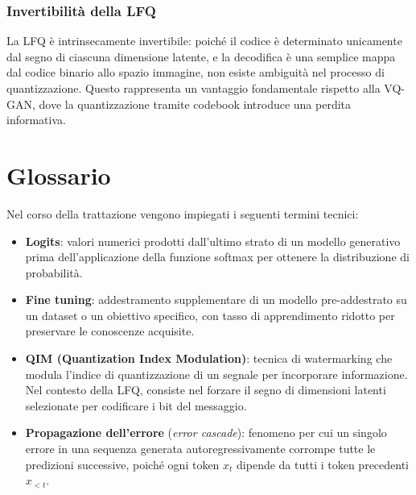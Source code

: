 \subsubsection{Invertibilità della LFQ}

La LFQ è intrinsecamente invertibile: poiché il codice è determinato unicamente dal segno di ciascuna dimensione latente, e la decodifica è una semplice mappa dal codice binario allo spazio immagine, non esiste ambiguità nel processo di quantizzazione. Questo rappresenta un vantaggio fondamentale rispetto alla VQ-GAN, dove la quantizzazione tramite codebook introduce una perdita informativa.

\section{Glossario}\label{sec:glossario}

Nel corso della trattazione vengono impiegati i seguenti termini tecnici:

\begin{itemize}
	\item \textbf{Logits}: valori numerici prodotti dall'ultimo strato di un modello generativo prima dell'applicazione della funzione softmax per ottenere la distribuzione di probabilità.
	
	\item \textbf{Fine tuning}: addestramento supplementare di un modello pre-addestrato su un dataset o un obiettivo specifico, con tasso di apprendimento ridotto per preservare le conoscenze acquisite.
	
	\item \textbf{QIM (Quantization Index Modulation)}: tecnica di watermarking che modula l'indice di quantizzazione di un segnale per incorporare informazione. Nel contesto della LFQ, consiste nel forzare il segno di dimensioni latenti selezionate per codificare i bit del messaggio.
	
	\item \textbf{Propagazione dell'errore} (\emph{error cascade}): fenomeno per cui un singolo errore in una sequenza generata autoregressivamente corrompe tutte le predizioni successive, poiché ogni token $x_t$ dipende da tutti i token precedenti $x_{<t}$.
\end{itemize}